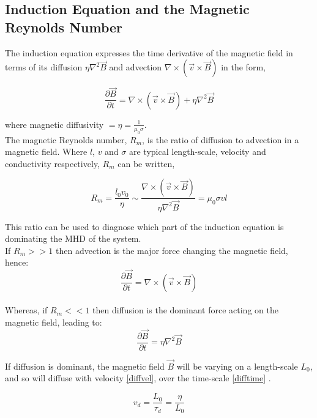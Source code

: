 \subsection{Induction Equation and the Magnetic Reynolds Number}
The induction equation expresses the time derivative of the magnetic field in terms of its diffusion $\eta\nabla^{2}\vec{B}$ and advection $\nabla\times(\vec{v}\times\vec{B})$ in the form, 


\begin{equation}\label{induction}
\frac{\partial \vec{B}}{\partial t}=\nabla\times(\vec{v}\times\vec{B})+\eta\nabla^{2}\vec{B}  
\end{equation}

where magnetic diffusivity $=\eta =\frac{1}{\mu_{0}\sigma}$. \\

The magnetic Reynolds number, $R_m$, is the ratio of diffusion to advection in a magnetic field. Where $l$, $v$ and $\sigma$ are typical length-scale, velocity and conductivity respectively, $R_m$ can be written,  

\begin{equation}\label{reynolds}
R_{m} = \frac{l_{0}v_{0}}{\eta} \sim \frac{\nabla\times(\vec{v}\times\vec{B})}{\eta\nabla^{2}\vec{B}}=\mu_{0}\sigma v l
\end{equation}

This ratio can be used to diagnose which part of the induction equation is dominating the MHD of the system. \\

If $R_m >> 1$ then advection is the major force changing the magnetic field, hence:
\begin{equation}\label{r>>1}
\frac{\partial \vec{B}}{\partial t}=\nabla\times(\vec{v}\times\vec{B})
\end{equation}
\\

Whereas, if $R_m << 1$ then diffusion is the dominant force acting on the magnetic field, leading to:
\begin{equation}\label{r<<1}
\frac{\partial \vec{B}}{\partial t}=\eta\nabla^{2}\vec{B}
\end{equation}

If diffusion is dominant, the magnetic field $\vec{B}$ will be varying on a length-scale $L_0$, and so will diffuse with velocity \ref{diffvel}, over the time-scale \ref{difftime} \citep{2003dysu.book.....D}.

\begin{equation}\label{diffvel}
v_d=\frac{L_0}{\tau_d} = \frac{\eta}{L_0}
\end{equation}


